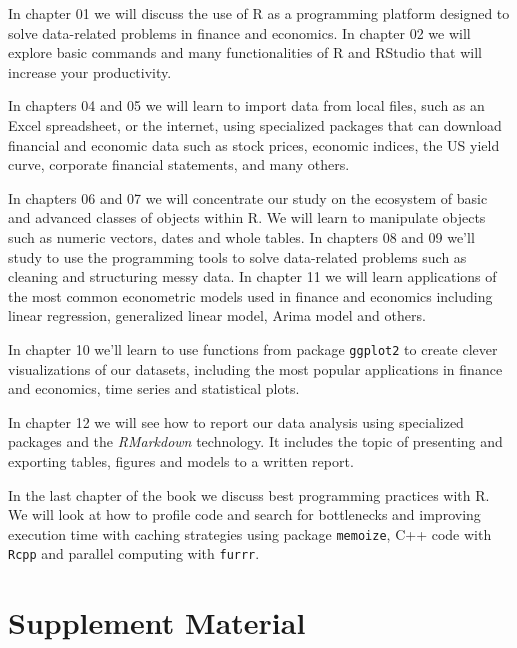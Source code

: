 \documentclass[
  12pt,
]{book}
\providecommand{\tightlist}{%
  \setlength{\itemsep}{0pt}\setlength{\parskip}{0pt}}
\begin{document}
\begin{description}
\tightlist
\item[Using R and RStudio]
In chapter 01 we will discuss the use of R as a programming platform designed to solve data-related problems in finance and economics. In chapter 02 we will explore basic commands and many functionalities of R and RStudio that will increase your productivity.
\item[Importing financial and economic data]
In chapters 04 and 05 we will learn to import data from local files, such as an Excel spreadsheet, or the internet, using specialized packages that can download financial and economic data such as stock prices, economic indices, the US yield curve, corporate financial statements, and many others.
\item[Cleaning, structuring and analyzing the data with R]
In chapters 06 and 07 we will concentrate our study on the ecosystem of basic and advanced classes of objects within R. We will learn to manipulate objects such as numeric vectors, dates and whole tables. In chapters 08 and 09 we'll study to use the programming tools to solve data-related problems such as cleaning and structuring messy data. In chapter 11 we will learn applications of the most common econometric models used in finance and economics including linear regression, generalized linear model, Arima model and others.
\item[Creating a visual analysis of data]
In chapter 10 we'll learn to use functions from package \texttt{ggplot2} to create clever visualizations of our datasets, including the most popular applications in finance and economics, time series and statistical plots.
\item[Reporting your results]
In chapter 12 we will see how to report our data analysis using specialized packages and the \emph{RMarkdown} technology. It includes the topic of presenting and exporting tables, figures and models to a written report.
\item[Writing better and faster code]
In the last chapter of the book we discuss best programming practices with R. We will look at how to profile code and search for bottlenecks and improving execution time with caching strategies using package \texttt{memoize}, C++ code with \texttt{Rcpp} and parallel computing with \texttt{furrr}.
\end{description}

\hypertarget{supplement-material}{%
\section*{Supplement Material}\label{supplement-material}}
\end{document}
